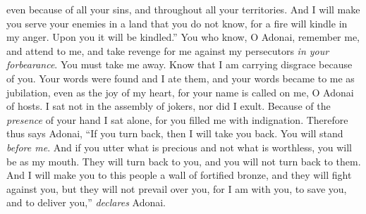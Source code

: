 \begin{biblechapter}
even because of all your sins, 
and throughout all your territories.
\verse And I will make you serve your enemies 
in a land that you do not know, 
for a fire will kindle in my anger. 
Upon you it will be kindled.”
\verse You who know, O Adonai, remember me, and attend to me, 
and take revenge for me against my persecutors \textit{in your forbearance}. 
You must take me away. 
Know that I am carrying disgrace because of you.
\verse Your words were found and I ate them, 
and your words became to me as jubilation, 
even as the joy of my heart, 
for your name is called on me, O Adonai of hosts.
\verse I sat not in the assembly of jokers, 
nor did I exult. 
Because of the \textit{presence} of your hand I sat alone, 
for you filled me with indignation.
\verse Therefore thus says Adonai,
\verse “If you turn back, then I will take you back. 
You will stand \textit{before me}. 
And if you utter what is precious and not what is worthless, 
you will be as my mouth. 
They will turn back to you, 
and you will not turn back to them.
\verse And I will make you to this people 
a wall of fortified bronze, 
and they will fight against you, 
but they will not prevail over you, 
for I am with you, to save you, 
and to deliver you,” \textit{declares} Adonai.
\end{biblechapter}

